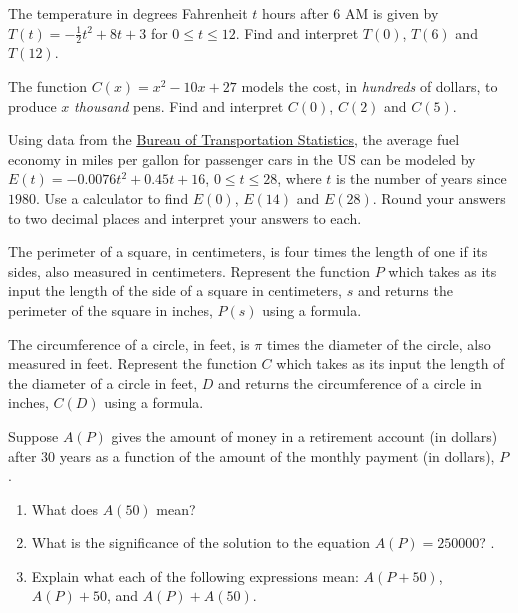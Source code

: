 \documentclass{ximera}
\begin{document}
\begin{problem}
The temperature in degrees Fahrenheit $t$ hours after 6 AM is given by $T(t) = -\frac{1}{2} t^2 + 8t+3$ for $0 \leq t \leq 12$. Find and interpret $T(0)$, $T(6)$ and $T(12)$. 
\end{problem}

\begin{problem}
The function $C(x) = x^2-10x+27$  models the cost, in \textit{hundreds} of dollars, to produce $x$ \textit{thousand} pens.  Find and interpret $C(0)$, $C(2)$ and $C(5)$.
\end{problem}

\begin{problem}
Using data from the  \href{http://www.bts.gov/publications/national_transportation_statistics/html/table_04_23.html}{\underline{Bureau of Transportation Statistics}}, the average fuel economy in miles per gallon for passenger cars in the US can be modeled by  $E(t) = -0.0076t^2+0.45t + 16$, $0 \leq t \leq 28$, where $t$ is the number of years since $1980$. Use a calculator to find $E(0)$, $E(14)$ and $E(28)$.  Round your answers to two decimal places and interpret your answers to each.
\end{problem} 

\begin{problem}
The perimeter of a square, in centimeters,  is four times the length of one if its sides, also measured in centimeters.  Represent the function $P$ which takes as its input the length of the side of a square in centimeters, $s$ and returns the perimeter of the square in inches, $P(s)$ using a formula.
\end{problem}

\begin{problem}
The circumference of a circle, in feet,  is $\pi$ times the diameter of the circle, also measured in feet.  Represent the function $C$ which takes as its input the length of the diameter of a circle in feet, $D$ and returns the circumference of a circle in inches, $C(D)$ using a formula.
\end{problem}

\begin{problem}
Suppose $A(P)$ gives the amount of money in a retirement account (in dollars) after 30 years as a function of the amount of the monthly payment (in dollars), $P$.

\begin{enumerate}

\item What does $A(50)$ mean?  

\item  What is the significance of the solution to the equation $A(P) = 250000$? .

\item  Explain what each of the following expressions mean:  $A(P+50)$, $A(P)+50$, and $A(P) + A(50)$.  

\end{enumerate}
\end{problem}
 
\end{document}
